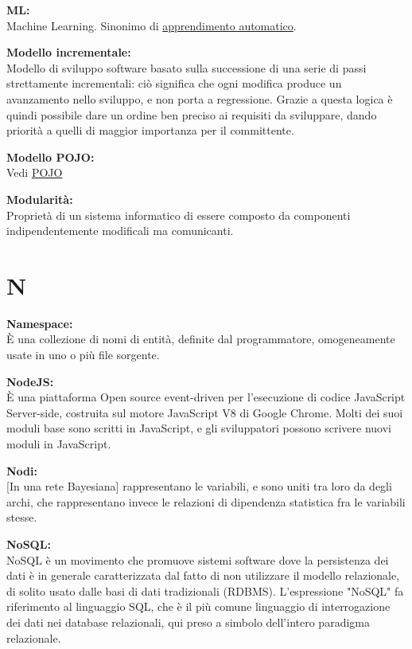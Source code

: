 \documentclass[a4paper, oneside, openany, dvipsnames, table]{article}
\begin{document}
\textbf{ML:}\\Machine Learning. Sinonimo di \hyperref[par:appr_auto]{apprendimento automatico}.

\textbf{Modello incrementale:}\\	Modello di sviluppo software basato sulla successione di una serie di passi strettamente incrementali: ciò significa che ogni modifica produce un avanzamento nello sviluppo, e non porta a regressione. Grazie a questa logica è quindi possibile dare un ordine ben preciso ai requisiti da sviluppare, dando priorità a quelli di maggior importanza per il committente.

\textbf{Modello POJO:} \\Vedi \hyperref[crts:POJO]{POJO}

\textbf{Modularità:}\\	Proprietà di un sistema informatico di essere composto da componenti indipendentemente modificali ma comunicanti.


\newpage
\section{N}

\textbf{Namespace:} \\ \`E una collezione di nomi di entità, definite dal programmatore, omogeneamente usate in uno o più file sorgente.

\textbf{NodeJS:}\\	\`E una piattaforma Open source event-driven per l'esecuzione di codice JavaScript Server-side, costruita sul motore JavaScript V8 di Google Chrome. Molti dei suoi moduli base sono scritti in JavaScript, e gli sviluppatori possono scrivere nuovi moduli in JavaScript.

\textbf{Nodi:}\\ 
{[}In una rete Bayesiana{]} rappresentano le variabili, e sono uniti tra loro da degli archi, che rappresentano invece le relazioni di dipendenza statistica fra le variabili stesse.

\textbf{NoSQL:}\\
NoSQL è un movimento che promuove sistemi software dove la persistenza dei dati è in generale caratterizzata dal fatto di non utilizzare il modello relazionale, di solito usato dalle basi di dati tradizionali (RDBMS). L'espressione "NoSQL" fa riferimento al linguaggio SQL, che è il più comune linguaggio di interrogazione dei dati nei database relazionali, qui preso a simbolo dell'intero paradigma relazionale.
\end{document}
